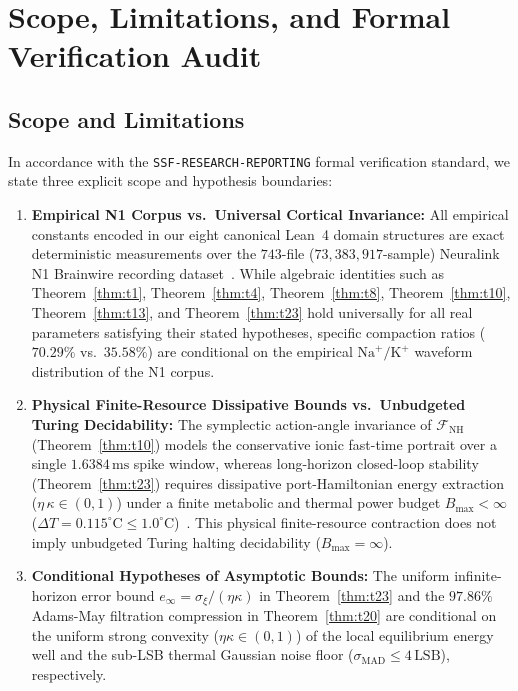 \documentclass[11pt,letterpaper]{article}
\theoremstyle{definition}
\begin{document}
\section{Scope, Limitations, and Formal Verification Audit}

\subsection{Scope and Limitations}
In accordance with the \texttt{SSF-RESEARCH-REPORTING} formal verification standard, we state three explicit scope and hypothesis boundaries:
\begin{enumerate}
  \item \textbf{Empirical N1 Corpus vs.\ Universal Cortical Invariance:} All empirical constants encoded in our eight canonical Lean~4 domain structures are exact deterministic measurements over the $743$-file ($73{,}383{,}917$-sample) Neuralink N1 Brainwire recording dataset~\cite{neuralink_compression_challenge}. While algebraic identities such as Theorem~\ref{thm:t1}, Theorem~\ref{thm:t4}, Theorem~\ref{thm:t8}, Theorem~\ref{thm:t10}, Theorem~\ref{thm:t13}, and Theorem~\ref{thm:t23} hold universally for all real parameters satisfying their stated hypotheses, specific compaction ratios ($70.29\%$ vs.\ $35.58\%$) are conditional on the empirical $\mathrm{Na}^+/\mathrm{K}^+$ waveform distribution of the N1 corpus.
  \item \textbf{Physical Finite-Resource Dissipative Bounds vs.\ Unbudgeted Turing Decidability:} The symplectic action-angle invariance of $\mathcal{F}_{\mathrm{NH}}$ (Theorem~\ref{thm:t10}) models the conservative ionic fast-time portrait over a single $1.6384\,\text{ms}$ spike window, whereas long-horizon closed-loop stability (Theorem~\ref{thm:t23}) requires dissipative port-Hamiltonian energy extraction ($\eta\,\kappa \in (0,1)$) under a finite metabolic and thermal power budget $B_{\max} < \infty$ ($\Delta T = 0.115^\circ\text{C} \le 1.0^\circ\text{C}$)~\cite{solidsf_halting2026}. This physical finite-resource contraction does not imply unbudgeted Turing halting decidability ($B_{\max} = \infty$).
  \item \textbf{Conditional Hypotheses of Asymptotic Bounds:} The uniform infinite-horizon error bound $e_\infty = \sigma_\xi/(\eta\kappa)$ in Theorem~\ref{thm:t23} and the $97.86\%$ Adams-May filtration compression in Theorem~\ref{thm:t20} are conditional on the uniform strong convexity ($\eta\kappa \in (0,1)$) of the local equilibrium energy well and the sub-LSB thermal Gaussian noise floor ($\sigma_{\mathrm{MAD}} \le 4\,\text{LSB}$), respectively.
\end{enumerate}
\end{document}
